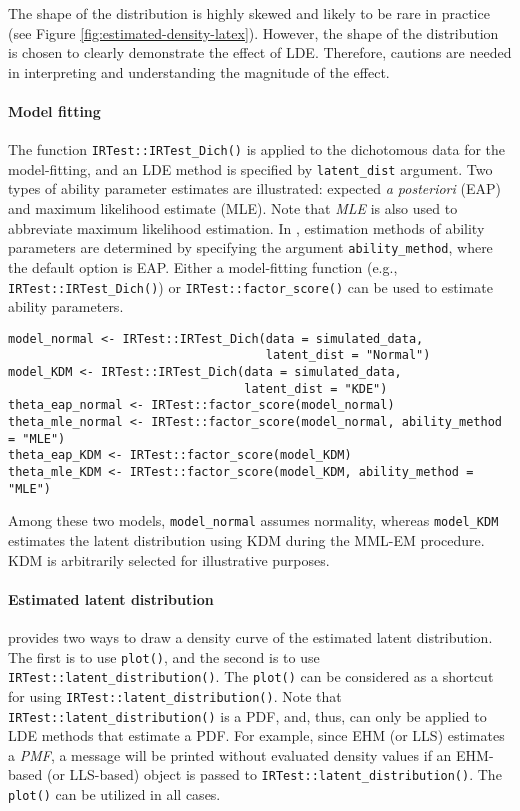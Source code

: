 The shape of the distribution is highly skewed and likely to be rare in
practice (see Figure
\ref{fig:estimated-density-latex}).
However, the shape of the distribution is chosen to clearly demonstrate
the effect of LDE. Therefore, cautions are needed in interpreting
and understanding the magnitude of the effect.

\hypertarget{model-fitting}{%
\paragraph{Model fitting}\label{model-fitting}}

The function \texttt{IRTest::IRTest\_Dich()} is applied to the dichotomous data
for the model-fitting, and an LDE method is specified by
\texttt{latent\_dist} argument. Two types of ability parameter estimates are illustrated:
expected \emph{a posteriori} (EAP) and maximum likelihood estimate (MLE). Note that \emph{MLE}
is also used to abbreviate maximum likelihood estimation. In , estimation
methods of ability parameters are determined by specifying the argument
\texttt{ability\_method}, where the default option is EAP. Either a
model-fitting function (e.g., \texttt{IRTest::IRTest\_Dich()}) or \texttt{IRTest::factor\_score()} can be
used to estimate ability parameters.

\begin{verbatim}
model_normal <- IRTest::IRTest_Dich(data = simulated_data,
                                    latent_dist = "Normal")
model_KDM <- IRTest::IRTest_Dich(data = simulated_data,
                                 latent_dist = "KDE")
theta_eap_normal <- IRTest::factor_score(model_normal)
theta_mle_normal <- IRTest::factor_score(model_normal, ability_method = "MLE")
theta_eap_KDM <- IRTest::factor_score(model_KDM)
theta_mle_KDM <- IRTest::factor_score(model_KDM, ability_method = "MLE")
\end{verbatim}

Among these two models, \texttt{model\_normal} assumes normality,
whereas \texttt{model\_KDM} estimates the latent distribution using KDM during the
MML-EM procedure. KDM is arbitrarily selected for illustrative purposes.

\hypertarget{estimated-latent-distribution}{%
\paragraph{Estimated latent distribution}\label{estimated-latent-distribution}}

 provides two ways to draw a density curve of the
estimated latent distribution. The first is to use \texttt{plot()}, and the
second is to use \texttt{IRTest::latent\_distribution()}. The \texttt{plot()} can be considered
as a shortcut for using \texttt{IRTest::latent\_distribution()}. Note that
\texttt{IRTest::latent\_distribution()} is a PDF, and, thus, can only be applied to LDE
methods that estimate a PDF. For example, since EHM (or LLS) estimates
a \emph{PMF}, a message will be printed without evaluated density values if an
EHM-based (or LLS-based) object is passed to
\texttt{IRTest::latent\_distribution()}. The \texttt{plot()} can be utilized in all
cases.

